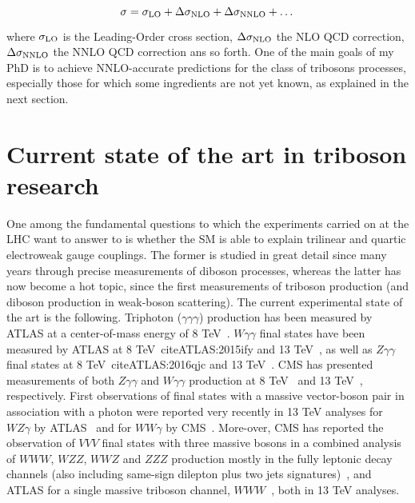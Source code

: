 \documentclass[a4paper, 11pt]{article}
\begin{document}
\begin{equation*}
    \sigma = \sigma_{\rm LO} + \Delta\sigma_{\rm NLO} +  \Delta\sigma_{\rm NNLO} + \dots
\end{equation*}

where $\sigma_{\rm LO}$ is the Leading-Order cross section, $\Delta\sigma_{\rm NLO}$ the NLO QCD correction, $\Delta\sigma_{\rm NNLO}$ the NNLO QCD correction ans so forth.
One of the main goals of my PhD is to achieve NNLO-accurate predictions for the class of tribosons processes, especially those for which some ingredients are not yet known, as explained in the next section.

\newpage
\section{Current state of the art in triboson research}
One among the fundamental questions to which the experiments carried on at the LHC want to answer to is whether the SM is able to explain trilinear and quartic electroweak gauge couplings. The former is studied in great detail since many years through precise measurements of diboson
processes, whereas the latter has now become a hot topic, since the first measurements of triboson production (and diboson production in weak-boson scattering). The current experimental state of the art is the following.
\newline Triphoton ($\gamma\gamma\gamma$) production has been measured by ATLAS at a center-of-mass energy of 8 TeV~\cite{ATLAS:2017lpx}. $W\gamma\gamma$ final states have been measured by ATLAS at 8 TeV~cite{ATLAS:2015ify} and 13 TeV~\cite{ATLAS:2023avk}, as well as $Z\gamma\gamma$ final states 
at 8 TeV~cite{ATLAS:2016qjc} and 13 TeV~\cite{ATLAS:2022wmu}. 
\newline CMS has presented measurements of both $Z\gamma\gamma$ and $W\gamma\gamma$ production at 8 TeV~\cite{CMS:2017tzy} and 13 TeV~\cite{CMS:2021jji}, respectively. First observations of final states with a massive vector-boson pair in association with a photon were reported very recently in 13 TeV analyses for $WZ\gamma$ 
by ATLAS~\cite{ATLAS:2023zkw} and for $WW\gamma$ by CMS~\cite{CMS:2023rcv}. More-over, CMS has reported the observation of $VVV$ final states with three massive bosons in a combined analysis of $WWW$, $WZZ$, $WWZ$ and $ZZZ$ production mostly in the fully leptonic decay channels (also including same-sign dilepton plus two jets 
signatures)~\cite{CMS:2020hjs}, and ATLAS for a single massive triboson channel, $WWW$~\cite{ATLAS:2022xnu}, both in 13 TeV analyses.






\newpage
\printbibliography[heading=bibintoc, title={Bibliography}]
\end{document}
